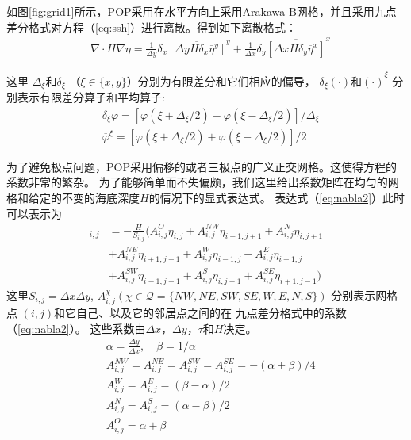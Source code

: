 如图\ref{fig:grid1}所示，POP采用在水平方向上采用Arakawa B网格\cite{smith2010parallel}，并且采用九点差分格式对方程（\ref{eq:ssh}）进行离散。得到如下离散格式：
\begin{align}
    & \nabla\cdot H \nabla \eta  =\frac{1}{\Delta y}\delta_x \overline{[\Delta y H  \delta_x\overline{\eta}^y]}^y +\frac{1}{\Delta x}\delta_y \overline{[\Delta x H  \delta_y\overline{\eta}^x]}^x \label{eq:nabla2}
  \end{align}

这里 $\Delta_\xi$和$\delta_\xi$  （$\xi \in \{x, y\} $）分别为有限差分和它们相应的偏导， $\delta_\xi (\cdot) $和$\overline{(\cdot)}^\xi $ 分别表示有限差分算子和平均算子:  
\begin{align}
&\delta_\xi \varphi = [\varphi (\xi+\Delta_\xi/2) -\varphi(\xi-\Delta_\xi/2)]/\Delta_\xi \\
&\overline{\varphi}^\xi  =[\varphi (\xi+\Delta_\xi/2) +\varphi(\xi-\Delta_\xi/2)]/2
\end{align}
 
 

为了避免极点问题，POP采用偏移的或者三极点的广义正交网格。这使得方程的系数非常的繁杂。
为了能够简单而不失偏颇，我们这里给出系数矩阵在均匀的网格和给定的不变的海底深度$H$的情况下的显式表达式。
表达式（\ref{eq:nabla2}）此时可以表示为
\begin{align}
 [\nabla\cdot H \nabla \eta]_{i,j}&= -\frac{H}{S_{i,j}}(A_{i,j}^O\eta_{i,j}+A_{i,j}^{NW}\eta_{i-1,j+1}+A_{i,j}^N\eta_{i,j+1} \nonumber\\
 &+A_{i,j}^{NE}\eta_{i+1,j+1}+A_{i,j}^W\eta_{i-1,j} +A_{i,j}^E\eta_{i+1,j} \nonumber\\
& +A_{i,j}^{SW}\eta_{i-1,j-1} +A_{i,j}^S\eta_{i,j-1}+ A_{i,j}^{SE}\eta_{i+1,j-1})
\end{align}
这里$S_{i,j}  = \Delta x\Delta y$, $A_{i,j}^{\chi } ( \chi \in \mathcal{Q} = \{NW,NE, SW, SE, W, E, N, S\})$ 分别表示网格点 $(i,j)$和它自己、以及它的邻居点之间的在 九点差分格式中的系数（\ref{eq:nabla2}）。 这些系数由$\Delta x$，$\Delta y$，$\tau$和$H$决定。
\begin{equation} \label{defineA}
\begin{aligned}
&\alpha  = \frac{ \Delta y}{ \Delta x }, \quad \beta  = 1/\alpha \\
&A_{i,j}^{NW} = A_{i,j}^{NE} =A_{i,j}^{SW} = A_{i,j}^{SE} = - (\alpha  +  \beta  )/4 \\
&A_{i,j}^{W} = A_{i,j}^{E} = (  \beta  -\alpha  )/2 \\
&A_{i,j}^{N} = A_{i,j}^{S} = (\alpha  -\beta )/2 \\
&A_{i,j}^{O} =   \alpha   +\beta  \\
\end{aligned}
\end{equation}


